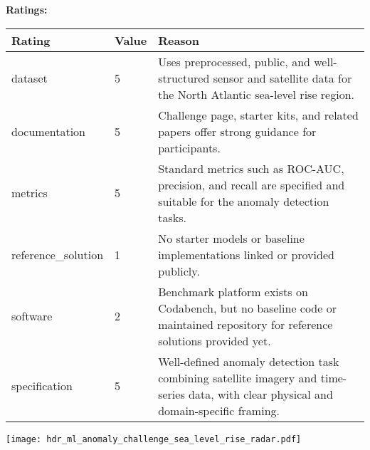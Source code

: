 {{{\bf Ratings:} ~ \\

\begin{tabular}{p{} p{} p{}}
\hline
Rating & Value & Reason \\
\hline
dataset & 5 & Uses preprocessed, public, and well-structured sensor and satellite data for the
North Atlantic sea-level rise region.
 \\
documentation & 5 & Challenge page, starter kits, and related papers offer strong guidance for participants.
 \\
metrics & 5 & Standard metrics such as ROC-AUC, precision, and recall are specified and suitable
for the anomaly detection tasks.
 \\
reference\_solution & 1 & No starter models or baseline implementations linked or provided publicly.
 \\
software & 2 & Benchmark platform exists on Codabench, but no baseline code or maintained repository
for reference solutions provided yet.
 \\
specification & 5 & Well-defined anomaly detection task combining satellite imagery and time-series data,
with clear physical and domain-specific framing.
 \\
\hline
\end{tabular}

\texttt{[image: hdr\_ml\_anomaly\_challenge\_sea\_level\_rise\_radar.pdf]}
}}
\clearpage